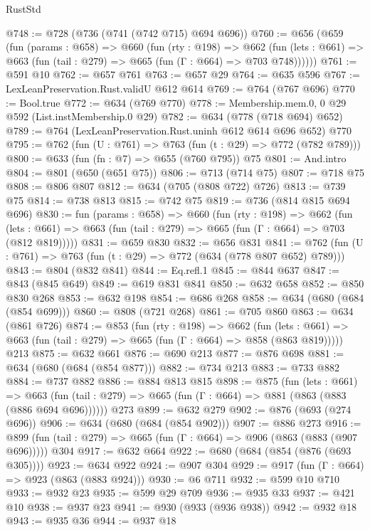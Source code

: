 \begin{lexlean}{RustStd}
\begin{coremodule}
{\begin{coremodule}
{{{{{{{{@748 := @728 (@736 (@741 (@742 @715) @694 @696))
@760 := @656
    (@659
      (fun (params : @658) =>
      @660
        (fun (rty : @198) =>
        @662
          (fun (lets : @661) => @663 (fun (tail : @279) => @665 (fun (Γ : @664) => @703 @748))))))
@761 := @591 @10
@762 := @657 @761
@763 := @657 @29
@764 := @635 @596
@767 := LexLeanPreservation.Rust.validU @612 @614
@769 := @764 (@767 @696)
@770 := Bool.true
@772 := @634 (@769 @770)
@778 := Membership.mem.{0, 0} @29 @592 (List.instMembership.{0} @29)
@782 := @634 (@778 (@718 @694) @652)
@789 := @764 (LexLeanPreservation.Rust.uninh @612 @614 @696 @652) @770
@795 := @762 (fun (U : @761) => @763 (fun (t : @29) => @772 (@782 @789)))
@800 := @633 (fun (fn : @7) => @655 (@760 @795)) @75
@801 := And.intro
@804 := @801 (@650 (@651 @75))
@806 := @713 (@714 @75)
@807 := @718 @75
@808 := @806 @807
@812 := @634 (@705 (@808 @722) @726)
@813 := @739 @75
@814 := @738 @813
@815 := @742 @75
@819 := @736 (@814 @815 @694 @696)
@830 := fun (params : @658) =>
  @660
    (fun (rty : @198) =>
    @662
      (fun (lets : @661) => @663 (fun (tail : @279) => @665 (fun (Γ : @664) => @703 (@812 @819)))))
@831 := @659 @830
@832 := @656 @831
@841 := @762 (fun (U : @761) => @763 (fun (t : @29) => @772 (@634 (@778 @807 @652) @789)))
@843 := @804 (@832 @841)
@844 := Eq.refl.{1}
@845 := @844 @637
@847 := @843 (@845 @649)
@849 := @619 @831 @841
@850 := @632 @658
@852 := @850 @830 @268
@853 := @632 @198
@854 := @686 @268
@858 := @634 (@680 (@684 (@854 @699)))
@860 := @808 (@721 @268)
@861 := @705 @860
@863 := @634 (@861 @726)
@874 := @853
    (fun (rty : @198) =>
    @662
      (fun (lets : @661) => @663 (fun (tail : @279) => @665 (fun (Γ : @664) => @858 (@863 @819)))))
    @213
@875 := @632 @661
@876 := @690 @213
@877 := @876 @698
@881 := @634 (@680 (@684 (@854 @877)))
@882 := @734 @213
@883 := @733 @882
@884 := @737 @882
@886 := @884 @813 @815
@898 := @875
    (fun (lets : @661) =>
    @663 (fun (tail : @279) => @665 (fun (Γ : @664) => @881 (@863 (@883 (@886 @694 @696))))))
    @273
@899 := @632 @279
@902 := @876 (@693 (@274 @696))
@906 := @634 (@680 (@684 (@854 @902)))
@907 := @886 @273
@916 := @899 (fun (tail : @279) => @665 (fun (Γ : @664) => @906 (@863 (@883 (@907 @696))))) @304
@917 := @632 @664
@922 := @680 (@684 (@854 (@876 (@693 @305))))
@923 := @634 @922
@924 := @907 @304
@929 := @917 (fun (Γ : @664) => @923 (@863 (@883 @924)))
@930 := @6 @711
@932 := @599 @10 @710
@933 := @932 @23
@935 := @599 @29 @709
@936 := @935 @33
@937 := @421 @10
@938 := @937 @23
@941 := @930 (@933 (@936 @938))
@942 := @932 @18
@943 := @935 @36
@944 := @937 @18
}}}}}}}}
\end{coremodule}}
\end{coremodule}
\end{lexlean}
